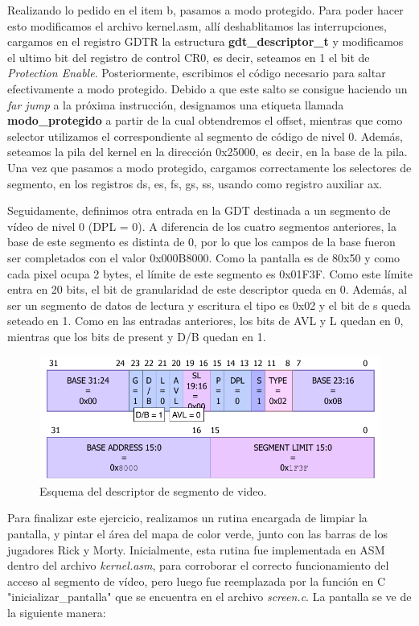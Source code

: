 \documentclass[a4paper]{article}
\begin{document}
\justify
Realizando lo pedido en el item b, pasamos a modo protegido. Para poder hacer esto modificamos el archivo kernel.asm, allí deshablitamos las interrupciones, cargamos en el registro GDTR la estructura \textbf{gdt_descriptor_t} y modificamos el ultimo bit del registro de control CR0, es decir, seteamos en 1 el bit de \textit{Protection Enable}. Posteriormente, escribimos el código necesario para saltar efectivamente a modo protegido. Debido a que este salto se consigue haciendo un \textit{far jump} a la próxima instrucción, designamos una etiqueta llamada \textbf{modo_protegido} a partir de la cual obtendremos el offset, mientras que como selector utilizamos el correspondiente al segmento de código de nivel 0. Además, seteamos la pila del kernel en la dirección 0x25000, es decir, en la base de la pila. Una vez que pasamos a modo protegido, cargamos correctamente los selectores de segmento, en los registros ds, es, fs, gs, ss, usando como registro auxiliar ax.


\justify
Seguidamente, definimos otra entrada en la GDT destinada a un segmento de vídeo de nivel 0 (DPL = 0). A diferencia de los cuatro segmentos anteriores, la base de este segmento es distinta de 0, por lo que los campos de la base fueron ser completados con el valor 0x000B8000. Como la pantalla es de 80x50 y como cada pixel ocupa 2 bytes, el límite de este segmento es 0x01F3F. Como este límite entra en 20 bits, el bit de granularidad de este descriptor queda en 0. Además, al ser un segmento de datos de lectura y escritura el tipo es 0x02 y el bit de s queda seteado en 1. Como en las entradas anteriores, los bits de AVL y L quedan en 0, mientras que los bits de present y D/B quedan en 1.  

\begin{figure}[h]
	\centering
	\includegraphics[scale=0.8]{img/DescriptorVideo.pdf}
	\caption{Esquema del descriptor de segmento de video.}
\end{figure}

\justify
Para finalizar este ejercicio, realizamos un rutina encargada de limpiar la pantalla, y pintar el área del mapa de color verde, junto con las barras de los jugadores Rick y Morty. Inicialmente, esta rutina fue implementada en ASM dentro del archivo \textit{kernel.asm}, para corroborar el correcto funcionamiento del acceso al segmento de vídeo, pero luego fue reemplazada por la función en C  "inicializar_pantalla" que se encuentra en el archivo \textit{screen.c}. La pantalla se ve de la siguiente manera:
\end{document}
